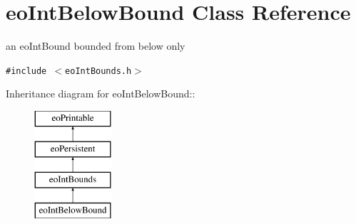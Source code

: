 \section{eo\-Int\-Below\-Bound Class Reference}
\label{classeo_int_below_bound}
an eo\-Int\-Bound bounded from below only  


{\tt \#include $<$eo\-Int\-Bounds.h$>$}

Inheritance diagram for eo\-Int\-Below\-Bound::\begin{figure}[H]
\begin{center}
\leavevmode
\includegraphics[height=4cm]{classeo_int_below_bound}
\end{center}
\end{figure}

